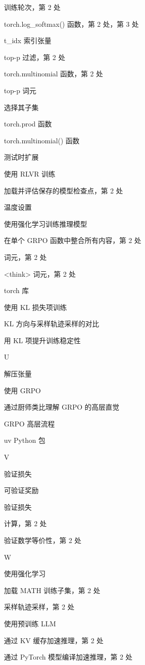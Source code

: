 训练轮次，第 2 处

torch.log\_softmax() 函数，第 2 处，第 3 处

t\_idx 索引张量

top-p 过滤，第 2 处

torch.multinomial 函数，第 2 处

top-p 词元

选择其子集

torch.prod 函数

torch.multinomial() 函数

测试时扩展

使用 RLVR 训练

加载并评估保存的模型检查点，第 2 处

温度设置

使用强化学习训练推理模型

在单个 GRPO 函数中整合所有内容，第 2 处

词元，第 2 处

\textless{}think\textgreater{} 词元，第 2 处

torch 库

使用 KL 损失项训练

KL 方向与采样轨迹采样的对比

用 KL 项提升训练稳定性

U

解压张量

使用 GRPO

通过厨师类比理解 GRPO 的高层直觉

GRPO 高层流程

uv Python 包

V

验证损失

可验证奖励

验证损失

计算，第 2 处

验证数学等价性，第 2 处

W

使用强化学习

加载 MATH 训练子集，第 2 处

采样轨迹采样，第 2 处

使用预训练 LLM

通过 KV 缓存加速推理，第 2 处

通过 PyTorch 模型编译加速推理，第 2 处
